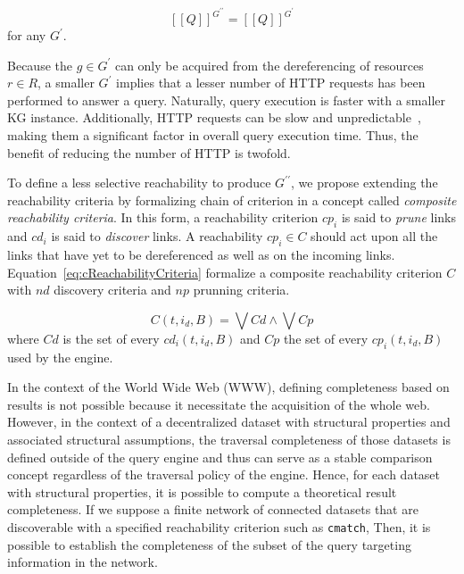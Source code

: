 \begin{equation}\label{eq:evalQueryStructuralAssumption}
   [\![ Q ]\!]^{G^{\prime\prime}} = [\![ Q ]\!]^{G^{\prime}}
\end{equation}
for any $G^{\prime}$.

Because the $g \in G^{\prime}$ can only be acquired from the dereferencing of resources $r \in R$, a smaller $G^\prime$ implies that a lesser number of HTTP requests has been performed to answer a query.
Naturally, query execution is faster with a smaller KG instance.
Additionally, HTTP requests can be slow and unpredictable~\cite{hartig2016walking}, making them a significant factor in overall query execution time. 
Thus, the benefit of reducing the number of HTTP is twofold.

To define a less selective reachability to produce $G^{\prime\prime}$, we propose extending the reachability criteria by formalizing chain of criterion in a concept called \emph{composite reachability criteria}.
In this form, a reachability criterion $cp_i$ is said to \emph{prune} links and $cd_i$ is said to \emph{discover} links.
A reachability $cp_i \in C$ should act upon all the links that have yet to be dereferenced as well as on the incoming links.
Equation~\ref{eq:cReachabilityCriteria} formalize a composite reachability criterion $C$ with $nd$ discovery criteria and $np$ prunning criteria.

\begin{equation}\label{eq:cReachabilityCriteria}
    C(t, i_d, B)  = \bigvee Cd \land \bigvee Cp
\end{equation}
where $Cd$ is the set of every $cd_i(t, i_d, B)$ and $Cp$ the set of every $cp_i(t, i_d, B)$ used by the engine.
\iffalse
Maybe refer to the link queue here in a footnote.
\fi

\iffalse
In the context of the World Wide Web (WWW), defining completeness based on results is not possible because it necessitate the acquisition of the whole web.
However, in the context of a decentralized dataset with structural properties and associated structural assumptions,
the traversal completeness of those datasets is defined outside of the query engine and thus can serve as a 
stable comparison concept regardless of the traversal policy of the engine.
Hence, for each dataset with structural properties, it is possible to compute a theoretical result completeness.
If we suppose a finite network of connected datasets that are discoverable with a specified reachability criterion such as \texttt{cmatch},
Then, it is possible to establish the completeness of the subset of the query targeting information in the network.



